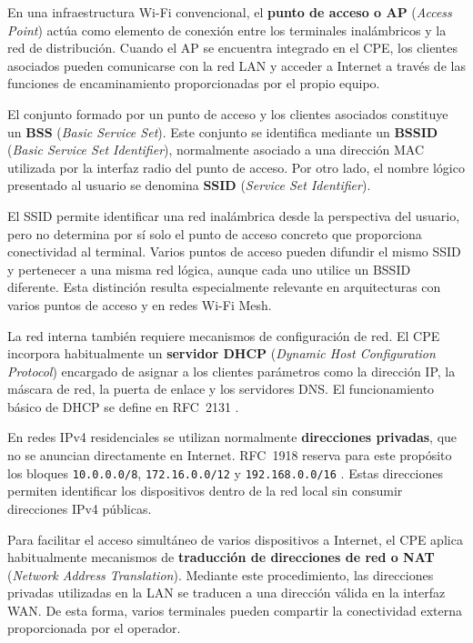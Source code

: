 En una infraestructura Wi-Fi convencional, el
\textbf{punto de acceso o AP}
(\textit{Access Point}) actúa como elemento de conexión entre los
terminales inalámbricos y la red de distribución. Cuando el AP se
encuentra integrado en el CPE, los clientes asociados pueden comunicarse
con la red LAN y acceder a Internet a través de las funciones de
encaminamiento proporcionadas por el propio equipo.

El conjunto formado por un punto de acceso y los clientes asociados
constituye un \textbf{BSS}
(\textit{Basic Service Set}). Este conjunto se identifica mediante un
\textbf{BSSID}
(\textit{Basic Service Set Identifier}), normalmente asociado a una
dirección MAC utilizada por la interfaz radio del punto de acceso. Por
otro lado, el nombre lógico presentado al usuario se denomina
\textbf{SSID}
(\textit{Service Set Identifier}).

El SSID permite identificar una red inalámbrica desde la perspectiva del
usuario, pero no determina por sí solo el punto de acceso concreto que
proporciona conectividad al terminal. Varios puntos de acceso pueden
difundir el mismo SSID y pertenecer a una misma red lógica, aunque cada
uno utilice un BSSID diferente. Esta distinción resulta especialmente
relevante en arquitecturas con varios puntos de acceso y en redes Wi-Fi
Mesh.

La red interna también requiere mecanismos de configuración de red. El
CPE incorpora habitualmente un \textbf{servidor DHCP}
(\textit{Dynamic Host Configuration Protocol}) encargado de asignar a los
clientes parámetros como la dirección IP, la máscara de red, la puerta
de enlace y los servidores DNS. El funcionamiento básico de DHCP se
define en RFC~2131 \cite{rfc2131}.

En redes IPv4 residenciales se utilizan normalmente
\textbf{direcciones privadas}, que no se anuncian directamente en
Internet. RFC~1918 reserva para este propósito los bloques
\texttt{10.0.0.0/8}, \texttt{172.16.0.0/12} y
\texttt{192.168.0.0/16} \cite{rfc1918}. Estas direcciones permiten
identificar los dispositivos dentro de la red local sin consumir
direcciones IPv4 públicas.

Para facilitar el acceso simultáneo de varios dispositivos a Internet,
el CPE aplica habitualmente mecanismos de
\textbf{traducción de direcciones de red o NAT}
(\textit{Network Address Translation}). Mediante este procedimiento, las
direcciones privadas utilizadas en la LAN se traducen a una dirección
válida en la interfaz WAN. De esta forma, varios terminales pueden
compartir la conectividad externa proporcionada por el operador.

